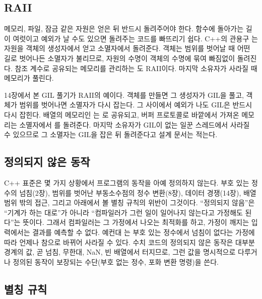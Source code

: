 \subsection{RAII}

메모리, 파일, 잠금 같은 자원은 얻은 뒤 반드시 돌려주어야 한다. 함수에 돌아가는 길이 여럿이고 예외가 날 수도 있으면 돌려주는 코드를 빠뜨리기 쉽다. C++의 관용구 는 자원을 객체의 생성자에서 얻고 소멸자에서 돌려준다\cite{stroustrup2013cpp}. 객체는 범위를 벗어날 때 어떤 길로 벗어나든 소멸자가 불리므로, 자원의 수명이 객체의 수명에 묶여 빠짐없이 돌려진다. 참조 계수로 공유되는 메모리를 관리하는 도 RAII이다. 마지막 소유자가 사라질 때 메모리가 풀린다.

\begin{instardust}
14장에서 본 GIL 풀기가 RAII의 예이다.  객체를 만들면 그 생성자가 GIL을 풀고, 객체가 범위를 벗어나면 소멸자가 다시 잡는다. 그 사이에서 예외가 나도 GIL은 반드시 다시 잡힌다. 배열의 메모리인 는 로 공유되고, 버퍼 프로토콜로 바깥에서 가져온 메모리는 소멸자에서 를 돌려준다. 마지막 소유자가 GIL이 없는 일꾼 스레드에서 사라질 수 있으므로 그 소멸자는 GIL을 잡은 뒤 돌려준다고 설계 문서는 적는다.
\end{instardust}

\subsection{정의되지 않은 동작}

C++ 표준은 몇 가지 상황에서 프로그램의 동작을 아예 정의하지 않는다. 부호 있는 정수의 넘침(2장), 범위를 벗어난 부동소수점의 정수 변환(8장), 데이터 경쟁(14장), 배열 범위 밖의 접근, 그리고 아래에서 볼 별칭 규칙의 위반이 그것이다. ``정의되지 않음''은 ``기계가 하는 대로''가 아니라 ``컴파일러가 그런 일이 일어나지 않는다고 가정해도 된다''는 뜻이다\cite{iso14882-2020}. 그래서 컴파일러는 그 가정에서 나오는 최적화를 하고, 가정이 깨지는 입력에서는 결과를 예측할 수 없다. 예컨대 는 부호 있는 정수에서 넘침이 없다는 가정에 따라 언제나 참으로 바뀌어 사라질 수 있다\cite{lattner2011ub}. 수치 코드의 정의되지 않은 동작은 대부분 경계의 값, 곧 넘침, 무한대, NaN, 빈 배열에서 터지므로, 그런 값을 명시적으로 다루거나 정의된 동작이 보장되는 수단(부호 없는 정수, 포화 변환 명령)을 쓴다.

\subsection{별칭 규칙}

